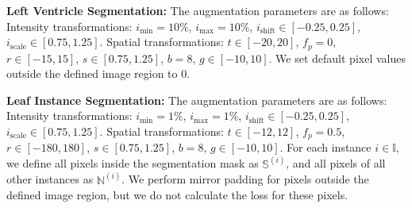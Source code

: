 \documentclass[runningheads,a4paper]{llncs}
\begin{document}
\begin{appendices}
\noindent\textbf{Left Ventricle Segmentation:}
The augmentation parameters are as follows:
Intensity transformations: $i_{\text{min}}=10\%$, $i_{\text{max}}=10\%$, $i_{\text{shift}} \in [-0.25, 0.25]$, $i_{\text{scale}}\in[0.75, 1.25]$.
Spatial transformations: $t\in[-20, 20]$, $f_p=0$, $r\in[-15, 15]$, $s\in[0.75, 1.25]$, $b=8$, $g\in[-10, 10]$.
We set default pixel values outside the defined image region to 0.

\noindent\textbf{Leaf Instance Segmentation:}
The augmentation parameters are as follows:
Intensity transformations: $i_{\text{min}}=1\%$, $i_{\text{max}}=1\%$, $i_{\text{shift}} \in [-0.25, 0.25]$, $i_{\text{scale}}\in[0.75, 1.25]$.
Spatial transformations: $t\in[-12, 12]$, $f_p=0.5$, $r\in[-180, 180]$, $s\in[0.75, 1.25]$, $b=8$, $g\in[-10, 10]$.
For each instance $i\in\mathbb{I}$, we define all pixels inside the segmentation mask as $\mathbb{S}^{(i)}$, and all pixels of all other instances as $\mathbb{N}^{(i)}$.
We perform mirror padding for pixels outside the defined image region, but we do not calculate the loss for these pixels.


\end{appendices}
\end{document}
